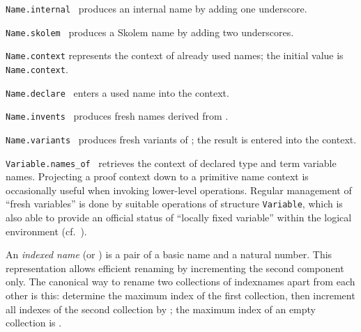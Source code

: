 \begin{isabellebody}
\begin{isamarkuptext}
  \begin{description}

  \item \verb|Name.internal|~ produces an internal name
  by adding one underscore.

  \item \verb|Name.skolem|~ produces a Skolem name by
  adding two underscores.

  \item \verb|Name.context| represents the context of already used
  names; the initial value is \verb|Name.context|.

  \item \verb|Name.declare|~ enters a used name into the
  context.

  \item \verb|Name.invents|~ produces  fresh names derived from .

  \item \verb|Name.variants|~ produces fresh
  variants of ; the result is entered into the context.

  \item \verb|Variable.names_of|~ retrieves the context
  of declared type and term variable names.  Projecting a proof
  context down to a primitive name context is occasionally useful when
  invoking lower-level operations.  Regular management of ``fresh
  variables'' is done by suitable operations of structure \verb|Variable|, which is also able to provide an official status of
  ``locally fixed variable'' within the logical environment (cf.\
  ).

  \end{description}%
\end{isamarkuptext}%
\isamarkuptrue%
%
\endisatagmlref
{\isafoldmlref}%
%
\isadelimmlref
%
\endisadelimmlref
%
\isamarkuptrue%
%
\begin{isamarkuptext}%
An \emph{indexed name} (or ) is a pair of a basic
  name and a natural number.  This representation allows efficient
  renaming by incrementing the second component only.  The canonical
  way to rename two collections of indexnames apart from each other is
  this: determine the maximum index \isa{maxidx} of the first
  collection, then increment all indexes of the second collection by
  \isa{maxidx\ {\isacharplus}\ {\isadigit{1}}}; the maximum index of an empty collection is
  \isa{{\isacharminus}{\isadigit{1}}}.


\end{isamarkuptext}
\end{isabellebody}
